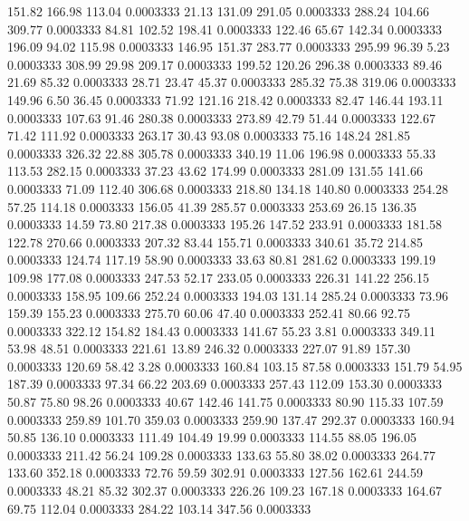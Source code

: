  151.82  166.98  113.04   0.0003333
  21.13  131.09  291.05   0.0003333
 288.24  104.66  309.77   0.0003333
  84.81  102.52  198.41   0.0003333
 122.46   65.67  142.34   0.0003333
 196.09   94.02  115.98   0.0003333
 146.95  151.37  283.77   0.0003333
 295.99   96.39    5.23   0.0003333
 308.99   29.98  209.17   0.0003333
 199.52  120.26  296.38   0.0003333
  89.46   21.69   85.32   0.0003333
  28.71   23.47   45.37   0.0003333
 285.32   75.38  319.06   0.0003333
 149.96    6.50   36.45   0.0003333
  71.92  121.16  218.42   0.0003333
  82.47  146.44  193.11   0.0003333
 107.63   91.46  280.38   0.0003333
 273.89   42.79   51.44   0.0003333
 122.67   71.42  111.92   0.0003333
 263.17   30.43   93.08   0.0003333
  75.16  148.24  281.85   0.0003333
 326.32   22.88  305.78   0.0003333
 340.19   11.06  196.98   0.0003333
  55.33  113.53  282.15   0.0003333
  37.23   43.62  174.99   0.0003333
 281.09  131.55  141.66   0.0003333
  71.09  112.40  306.68   0.0003333
 218.80  134.18  140.80   0.0003333
 254.28   57.25  114.18   0.0003333
 156.05   41.39  285.57   0.0003333
 253.69   26.15  136.35   0.0003333
  14.59   73.80  217.38   0.0003333
 195.26  147.52  233.91   0.0003333
 181.58  122.78  270.66   0.0003333
 207.32   83.44  155.71   0.0003333
 340.61   35.72  214.85   0.0003333
 124.74  117.19   58.90   0.0003333
  33.63   80.81  281.62   0.0003333
 199.19  109.98  177.08   0.0003333
 247.53   52.17  233.05   0.0003333
 226.31  141.22  256.15   0.0003333
 158.95  109.66  252.24   0.0003333
 194.03  131.14  285.24   0.0003333
  73.96  159.39  155.23   0.0003333
 275.70   60.06   47.40   0.0003333
 252.41   80.66   92.75   0.0003333
 322.12  154.82  184.43   0.0003333
 141.67   55.23    3.81   0.0003333
 349.11   53.98   48.51   0.0003333
 221.61   13.89  246.32   0.0003333
 227.07   91.89  157.30   0.0003333
 120.69   58.42    3.28   0.0003333
 160.84  103.15   87.58   0.0003333
 151.79   54.95  187.39   0.0003333
  97.34   66.22  203.69   0.0003333
 257.43  112.09  153.30   0.0003333
  50.87   75.80   98.26   0.0003333
  40.67  142.46  141.75   0.0003333
  80.90  115.33  107.59   0.0003333
 259.89  101.70  359.03   0.0003333
 259.90  137.47  292.37   0.0003333
 160.94   50.85  136.10   0.0003333
 111.49  104.49   19.99   0.0003333
 114.55   88.05  196.05   0.0003333
 211.42   56.24  109.28   0.0003333
 133.63   55.80   38.02   0.0003333
 264.77  133.60  352.18   0.0003333
  72.76   59.59  302.91   0.0003333
 127.56  162.61  244.59   0.0003333
  48.21   85.32  302.37   0.0003333
 226.26  109.23  167.18   0.0003333
 164.67   69.75  112.04   0.0003333
 284.22  103.14  347.56   0.0003333
